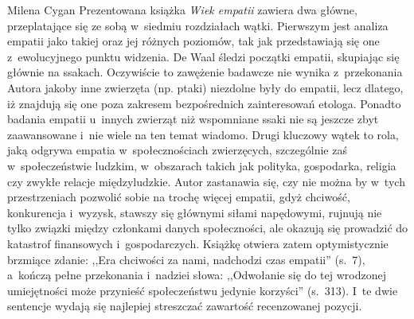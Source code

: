 \begin{recplenv}{Milena Cygan}
Prezentowana książka \textit{Wiek empatii} zawiera dwa główne, przeplatające się ze sobą w~siedmiu rozdziałach wątki.
Pierwszym jest analiza empatii jako takiej oraz jej różnych poziomów, tak jak przedstawiają się one z~ewolucyjnego
punktu widzenia. De Waal śledzi początki empatii, skupiając się głównie na ssakach. Oczywiście to zawężenie badawcze
nie wynika z~przekonania Autora jakoby inne zwierzęta (np. ptaki) niezdolne były do empatii, lecz dlatego, iż znajdują
się one poza zakresem bezpośrednich zainteresowań etologa. Ponadto badania empatii u~innych zwierząt niż wspomniane
ssaki nie są jeszcze zbyt zaawansowane i~nie wiele na ten temat wiadomo. Drugi kluczowy wątek to rola, jaką odgrywa
empatia w~społecznościach zwierzęcych, szczególnie zaś w~społeczeństwie ludzkim, w~obszarach takich jak polityka,
gospodarka, religia czy zwykłe relacje międzyludzkie. Autor zastanawia się, czy nie można by w~tych przestrzeniach
pozwolić sobie na trochę więcej empatii, gdyż chciwość, konkurencja i~wyzysk, stawszy się głównymi siłami napędowymi,
rujnują nie tylko związki między członkami danych społeczności, ale okazują się prowadzić do katastrof
finansowych i~gospodarczych. Książkę otwiera zatem optymistycznie brzmiące zdanie: ,,Era chciwości za nami,
nadchodzi czas empatii''
(s.~7), a~kończą pełne przekonania i~nadziei słowa: ,,Odwołanie się do tej wrodzonej umiejętności może przynieść
społeczeństwu jedynie korzyści'' (s.~313). I~te dwie sentencje wydają się najlepiej streszczać zawartość recenzowanej
pozycji.


\end{recplenv}
